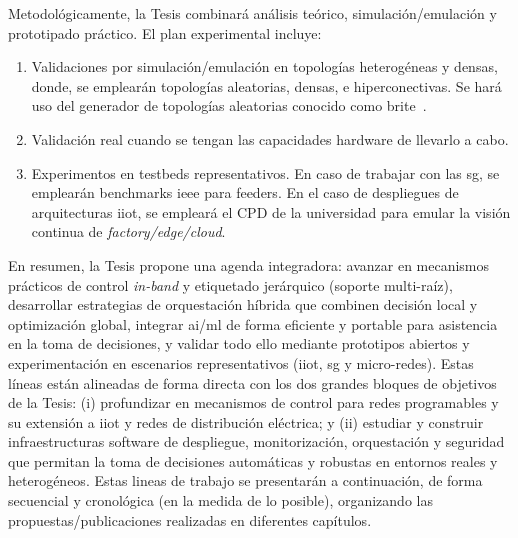 Metodológicamente, la Tesis combinará análisis teórico, simulación/emulación y prototipado práctico. El plan experimental incluye:

\begin{enumerate}
    \item Validaciones por simulación/emulación en topologías heterogéneas y densas, donde, se emplearán topologías aleatorias, densas, e hiperconectivas. Se hará uso del generador de topologías aleatorias conocido como \gls{brite}~\cite{brite}.

    \item Validación real cuando se tengan las capacidades hardware de llevarlo a cabo.

    \item Experimentos en testbeds representativos. En caso de trabajar  con las \gls{sg}, se emplearán benchmarks \gls{ieee} para feeders. En el caso de despliegues de arquitecturas \gls{iiot}, se empleará el CPD de la universidad para emular la visión continua de \textit{factory/edge/cloud}. 

\end{enumerate}


En resumen, la Tesis propone una agenda integradora: avanzar en mecanismos prácticos de control \textit{in-band} y etiquetado jerárquico (soporte multi-raíz), desarrollar estrategias de orquestación híbrida que combinen decisión local y optimización global, integrar \gls{ai}/\gls{ml} de forma eficiente y portable para asistencia en la toma de decisiones, y validar todo ello mediante prototipos abiertos y experimentación en escenarios representativos (\gls{iiot}, \gls{sg} y micro-redes). Estas líneas están alineadas de forma directa con los dos grandes bloques de objetivos de la Tesis: (i) profundizar en mecanismos de control para redes programables y su extensión a \gls{iiot} y redes de distribución eléctrica; y (ii) estudiar y construir infraestructuras software de despliegue, monitorización, orquestación y seguridad que permitan la toma de decisiones automáticas y robustas en entornos reales y heterogéneos. Estas lineas de trabajo se presentarán a continuación, de forma secuencial y cronológica (en la medida de lo posible), organizando las propuestas/publicaciones realizadas en diferentes capítulos. 


